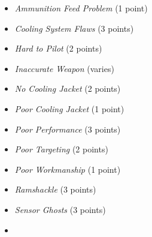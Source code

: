 \begin{multicols}{2}

\begin{itemize}

\item \emph{Ammunition Feed Problem} (1 point)

\item \emph{Cooling System Flaws} (3 points)

\item \emph{Hard to Pilot} (2 points)

\item \emph{Inaccurate Weapon} (varies)

\item \emph{No Cooling Jacket} (2 points)

\item \emph{Poor Cooling Jacket} (1 point)

\item \emph{Poor Performance} (3 points)

\item \emph{Poor Targeting} (2 points)

\item \emph{Poor Workmanship} (1 point)

\item \emph{Ramshackle} (3 points)

\item \emph{Sensor Ghosts} (3 points)

\item[\vspace{\fill}]

\end{itemize}

\end{multicols}
